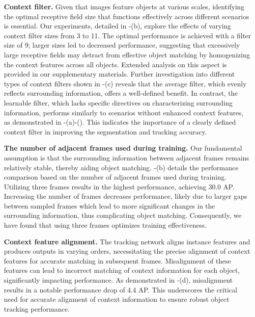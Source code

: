 \documentclass[10pt,twocolumn,letterpaper]{article}
\begin{document}
\textbf{Context filter.}
Given that images feature objects at various scales, identifying the optimal receptive field size that functions effectively across different scenarios is essential. Our experiments, detailed in -(b), explore the effects of varying context filter sizes from 3 to 11. The optimal performance is achieved with a filter size of 9; larger sizes led to decreased performance, suggesting that excessively large receptive fields may detract from effective object matching by homogenizing the context features across all objects. Extended analysis on this aspect is provided in our supplementary materials.
Further investigation into different types of context filters shown in -(c) reveals that the average filter, which evenly reflects surrounding information, offers a well-defined benefit. In contrast, the learnable filter, which lacks specific directives on characterizing surrounding information, performs similarly to scenarios without enhanced context features, as demonstrated in -(a)-(). This indicates the importance of a clearly defined context filter in improving the segmentation and tracking accuracy.

\textbf{The number of adjacent frames used during training.}
Our fundamental assumption is that the surrounding information between adjacent frames remains relatively stable, thereby aiding object matching. -(b) details the performance comparison based on the number of adjacent frames used during training. Utilizing three frames results in the highest performance, achieving 30.0 AP. Increasing the number of frames decreases performance, likely due to larger gaps between sampled frames which lead to more significant changes in the surrounding information, thus complicating object matching. Consequently, we have found that using three frames optimizes training effectiveness.

\textbf{Context feature alignment. }
The tracking network aligns instance features and produces outputs in varying orders, necessitating the precise alignment of context features for accurate matching in subsequent frames. Misalignment of these features can lead to incorrect matching of context information for each object, significantly impacting performance. As demonstrated in -(d), misalignment results in a notable performance drop of 4.4 AP. This underscores the critical need for accurate alignment of context information to ensure robust object tracking performance.
\end{document}
